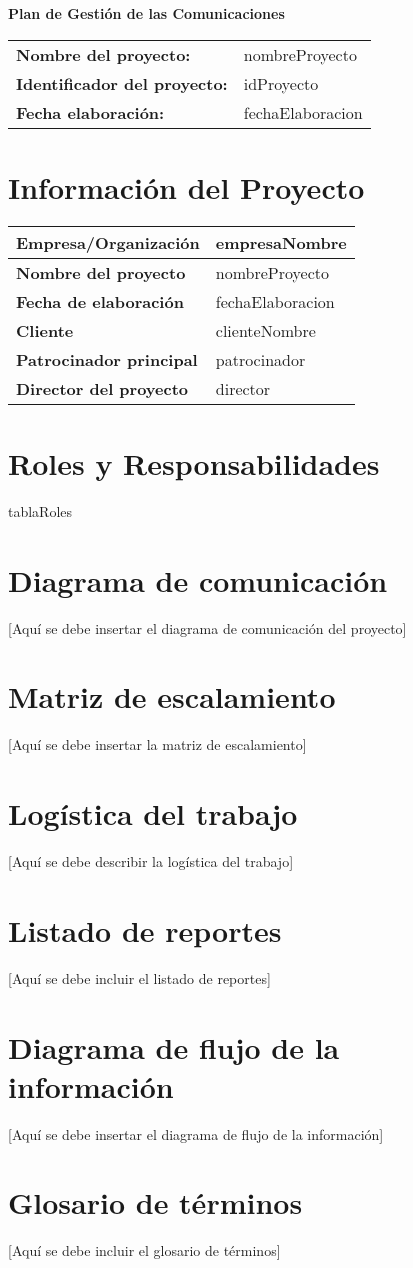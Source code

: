 \documentclass[12pt]{article}
\begin{document}
{\LARGE\textbf{Plan de Gestión de las Comunicaciones}}\\[1cm]

\begin{tabular}{ll}
\textbf{Nombre del proyecto:} & {{nombreProyecto}} \\[0.3cm]
\textbf{Identificador del proyecto:} & {{idProyecto}} \\[0.3cm]
\textbf{Fecha elaboración:} & {{fechaElaboracion}} \\
\end{tabular}

\tableofcontents
\newpage

\section{Información del Proyecto}
\begin{tabular}{|p{5cm}|p{8cm}|}
\hline
\textbf{Empresa/Organización} & {{empresaNombre}} \\
\hline
\textbf{Nombre del proyecto} & {{nombreProyecto}} \\
\hline
\textbf{Fecha de elaboración} & {{fechaElaboracion}} \\
\hline
\textbf{Cliente} & {{clienteNombre}} \\
\hline
\textbf{Patrocinador principal} & {{patrocinador}} \\
\hline
\textbf{Director del proyecto} & {{director}} \\
\hline
\end{tabular}

\section{Roles y Responsabilidades}
{{tablaRoles}}

\section{Diagrama de comunicación}
[Aquí se debe insertar el diagrama de comunicación del proyecto]

\section{Matriz de escalamiento}
[Aquí se debe insertar la matriz de escalamiento]

\section{Logística del trabajo}
[Aquí se debe describir la logística del trabajo]

\section{Listado de reportes}
[Aquí se debe incluir el listado de reportes]

\section{Diagrama de flujo de la información}
[Aquí se debe insertar el diagrama de flujo de la información]

\section{Glosario de términos}
[Aquí se debe incluir el glosario de términos]
\end{document}
